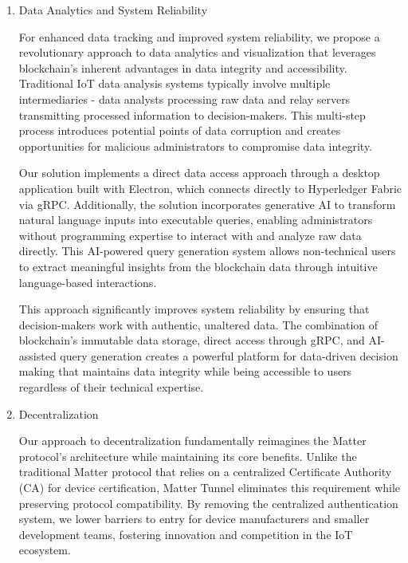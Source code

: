 \documentclass[conference]{IEEEtran}
\begin{document}
\begin{enumerate}[itemsep=2ex, parsep=1ex]
	\item Data Analytics and System Reliability
	      	      
	      For enhanced data tracking and improved system reliability, we propose a revolutionary
	      approach to data analytics and visualization that leverages blockchain's inherent
	      advantages in data integrity and accessibility. Traditional IoT data
	      analysis systems typically involve multiple intermediaries - data analysts
	      processing raw data and relay servers transmitting processed information
	      to decision-makers. This multi-step process introduces potential points of
	      data corruption and creates opportunities for malicious administrators to compromise
	      data integrity.
	      	      
	      Our solution implements a direct data access approach through a desktop application
	      built with Electron, which connects directly to Hyperledger Fabric via
	      gRPC. Additionally, the solution incorporates generative AI to transform
	      natural language inputs into executable queries, enabling administrators without
	      programming expertise to interact with and analyze raw data directly. This
	      AI-powered query generation system allows non-technical users to extract
	      meaningful insights from the blockchain data through intuitive language-based
	      interactions.
	      	      
	      This approach significantly improves system reliability by ensuring that
	      decision-makers work with authentic, unaltered data. The combination of
	      blockchain's immutable data storage, direct access through gRPC, and AI-assisted
	      query generation creates a powerful platform for data-driven decision
	      making that maintains data integrity while being accessible to users
	      regardless of their technical expertise.
	      	      
	\item Decentralization
	      	      
	      Our approach to decentralization fundamentally reimagines the Matter
	      protocol's architecture while maintaining its core benefits. Unlike the traditional
	      Matter protocol that relies on a centralized Certificate Authority (CA) for
	      device certification, Matter Tunnel eliminates this requirement while
	      preserving protocol compatibility. By removing the centralized authentication
	      system, we lower barriers to entry for device manufacturers and smaller
	      development teams, fostering innovation and competition in the IoT ecosystem.
	      	      

\end{enumerate}
\end{document}
